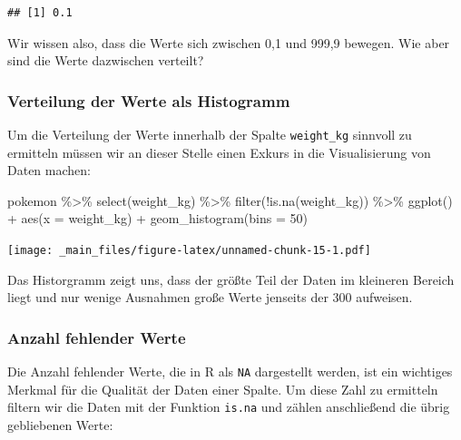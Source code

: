 \documentclass[
]{book}
\newenvironment{Shaded}{\begin{snugshade}}{\end{snugshade}}
\newcommand{\AttributeTok}[1]{\textcolor[rgb]{0.77,0.63,0.00}{#1}}
\newcommand{\DecValTok}[1]{\textcolor[rgb]{0.00,0.00,0.81}{#1}}
\newcommand{\FunctionTok}[1]{\textcolor[rgb]{0.00,0.00,0.00}{#1}}
\newcommand{\NormalTok}[1]{#1}
\newcommand{\SpecialCharTok}[1]{\textcolor[rgb]{0.00,0.00,0.00}{#1}}
\begin{document}
\begin{verbatim}
## [1] 0.1
\end{verbatim}

Wir wissen also, dass die Werte sich zwischen 0,1 und 999,9 bewegen. Wie aber sind die Werte dazwischen verteilt?

\hypertarget{wertebereich-intervallskaliert-histogramm}{%
\subsubsection{Verteilung der Werte als Histogramm}\label{wertebereich-intervallskaliert-histogramm}}

Um die Verteilung der Werte innerhalb der Spalte \texttt{weight\_kg} sinnvoll zu ermitteln müssen wir an dieser Stelle einen Exkurs in die Visualisierung von Daten machen:

\begin{Shaded}
\begin{Highlighting}[]
\NormalTok{pokemon }\SpecialCharTok{\%\textgreater{}\%}
  \FunctionTok{select}\NormalTok{(weight\_kg) }\SpecialCharTok{\%\textgreater{}\%}
  \FunctionTok{filter}\NormalTok{(}\SpecialCharTok{!}\FunctionTok{is.na}\NormalTok{(weight\_kg)) }\SpecialCharTok{\%\textgreater{}\%}
  \FunctionTok{ggplot}\NormalTok{() }\SpecialCharTok{+}
  \FunctionTok{aes}\NormalTok{(}\AttributeTok{x =}\NormalTok{ weight\_kg) }\SpecialCharTok{+}
  \FunctionTok{geom\_histogram}\NormalTok{(}\AttributeTok{bins =} \DecValTok{50}\NormalTok{)}
\end{Highlighting}
\end{Shaded}

\texttt{[image: \_main\_files/figure-latex/unnamed-chunk-15-1.pdf]}

Das Historgramm zeigt uns, dass der größte Teil der Daten im kleineren Bereich liegt und nur wenige Ausnahmen große Werte jenseits der 300 aufweisen.

\hypertarget{anzahl-fehlender-werte}{%
\subsubsection{Anzahl fehlender Werte}\label{anzahl-fehlender-werte}}

Die Anzahl fehlender Werte, die in R als \texttt{NA} dargestellt werden, ist ein wichtiges Merkmal für die Qualität der Daten einer Spalte. Um diese Zahl zu ermitteln filtern wir die Daten mit der Funktion \texttt{is.na} und zählen anschließend die übrig gebliebenen Werte:
\end{document}
